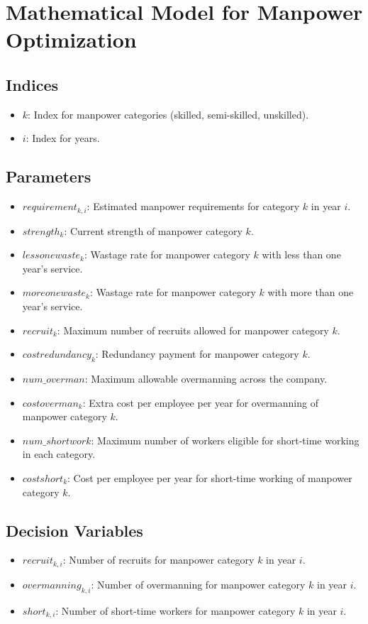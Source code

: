 \documentclass{article}
\begin{document}
\section*{Mathematical Model for Manpower Optimization}

\subsection*{Indices}
\begin{itemize}
    \item $k$: Index for manpower categories (skilled, semi-skilled, unskilled).
    \item $i$: Index for years.
\end{itemize}

\subsection*{Parameters}
\begin{itemize}
    \item $requirement_{k, i}$: Estimated manpower requirements for category $k$ in year $i$.
    \item $strength_{k}$: Current strength of manpower category $k$.
    \item $lessonewaste_{k}$: Wastage rate for manpower category $k$ with less than one year's service.
    \item $moreonewaste_{k}$: Wastage rate for manpower category $k$ with more than one year's service.
    \item $recruit_{k}$: Maximum number of recruits allowed for manpower category $k$.
    \item $costredundancy_{k}$: Redundancy payment for manpower category $k$.
    \item $num\_overman$: Maximum allowable overmanning across the company.
    \item $costoverman_{k}$: Extra cost per employee per year for overmanning of manpower category $k$.
    \item $num\_shortwork$: Maximum number of workers eligible for short-time working in each category.
    \item $costshort_{k}$: Cost per employee per year for short-time working of manpower category $k$.
\end{itemize}

\subsection*{Decision Variables}
\begin{itemize}
    \item $recruit_{k, i}$: Number of recruits for manpower category $k$ in year $i$.
    \item $overmanning_{k, i}$: Number of overmanning for manpower category $k$ in year $i$.
    \item $short_{k, i}$: Number of short-time workers for manpower category $k$ in year $i$.
\end{itemize}
\end{document}
